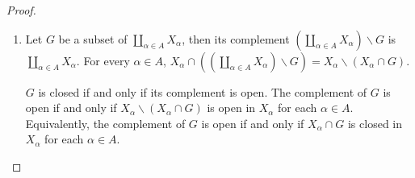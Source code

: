 \begin{proof}
    \begin{enumerate}[label={(\alph*)}]
        \item Let $G$ be a subset of $\coprod_{\alpha\in A}X_{\alpha}$, then its complement $\left(\coprod_{\alpha\in A}X_{\alpha}\right)\smallsetminus G$ is $\coprod_{\alpha\in A}X_{\alpha}$. For every $\alpha\in A$, $X_{\alpha}\cap \left(\left(\coprod_{\alpha\in A}X_{\alpha}\right)\smallsetminus G\right) = X_{\alpha}\smallsetminus (X_{\alpha}\cap G)$.

              $G$ is closed if and only if its complement is open. The complement of $G$ is open if and only if $X_{\alpha}\smallsetminus (X_{\alpha}\cap G)$ is open in $X_{\alpha}$ for each $\alpha\in A$. Equivalently, the complement of $G$ is open if and only if $X_{\alpha}\cap G$ is closed in $X_{\alpha}$ for each $\alpha\in A$.


\end{enumerate}
\end{proof}
